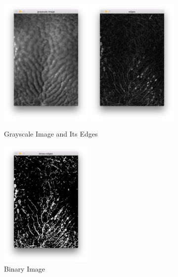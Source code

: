 \begin{figure}[H]
  	\centering
    \includegraphics[width=0.4\textwidth]{images/algorithm/grayscale.png}
    \includegraphics[width=0.4\textwidth]{images/algorithm/edges.png}

  	\caption[Grayscale Image and Its Edges]{Grayscale Image and Its Edges}
  	\label{fig:grayscale}
\end{figure}


\begin{figure}[H]
  	\centering
    \includegraphics[width=0.4\textwidth]{images/algorithm/binary.png}

  	\caption[Binary Image]{Binary Image}
  	\label{fig:binary}
\end{figure}


